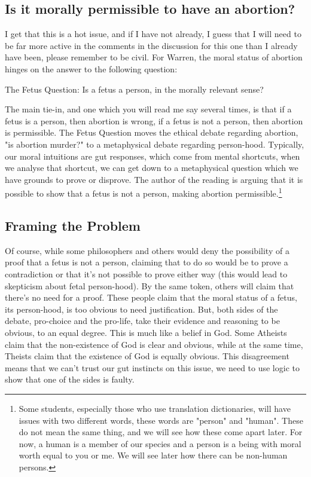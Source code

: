 \subsection{Is it morally permissible to have an abortion?}

I get that this is a hot issue, and if I have not already, I guess that I will need to be far more active in the comments in the discussion for this one than I already have been, please remember to be civil. For Warren, the moral status of abortion hinges on the answer to the following question:

\begin{center}
The Fetus Question: Is a fetus a person, in the morally relevant sense?
\end{center}

The main tie-in, and one which you will read me say several times, is that if a fetus is a person, then abortion is wrong, if a fetus is not a person, then abortion is permissible. The Fetus Question moves the ethical debate regarding abortion, "is abortion murder?" to a metaphysical debate regarding person-hood. Typically, our moral intuitions are gut responses, which come from mental shortcuts, when we analyse that shortcut, we can get down to a metaphysical question which we have grounds to prove or disprove. The author of the reading is arguing that it is possible to show that a fetus is not a person, making abortion permissible.\footnote{Some students, especially those who use translation dictionaries, will have issues with two different words, these words are "person" and "human". These do not mean the same thing, and we will see how these come apart later. For now, a human is a member of our species and a person is a being with moral worth equal to you or me. We will see later how there can be non-human persons.} 

\subsection{Framing the Problem}

Of course, while some philosophers and others would deny the possibility of a proof that a fetus is not a person, claiming that to do so would be to prove a contradiction or that it's not possible to prove either way (this would lead to skepticism about fetal person-hood). By the same token, others will claim that there's no need for a proof. These people claim that the moral status of a fetus, its person-hood, is too obvious to need justification. But, both sides of the debate, pro-choice and the pro-life, take their evidence and reasoning to be obvious, to an equal degree. This is much like a belief in God. Some Atheists claim that the non-existence of God is clear and obvious, while at the same time, Theists claim that the existence of God is equally obvious. This disagreement means that we can't trust our gut instincts on this issue, we need to use logic to show that one of the sides is faulty.

